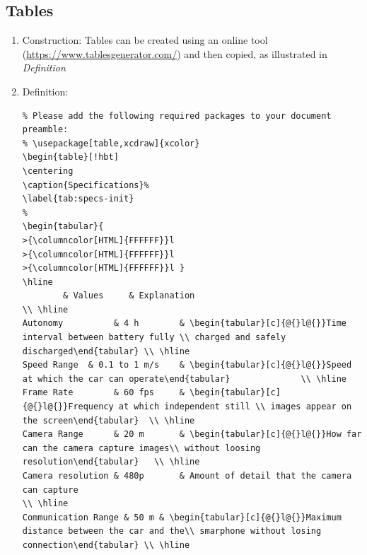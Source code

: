 \documentclass[11pt]{article}
\begin{document}
\subsection{Tables}
\label{sec:org333b62a}
\begin{enumerate}
\item Construction: Tables can be created using an online tool
(\url{https://www.tablesgenerator.com/}) and then copied, as illustrated in
\emph{Definition}
\item Definition: 
\lstset{language=[LaTeX]TeX,label= ,caption= ,captionpos=b,numbers=none}
\begin{lstlisting}
% Please add the following required packages to your document preamble:
% \usepackage[table,xcdraw]{xcolor}
\begin{table}[!hbt]
\centering
\caption{Specifications}%
\label{tab:specs-init}
%
\begin{tabular}{
>{\columncolor[HTML]{FFFFFF}}l 
>{\columncolor[HTML]{FFFFFF}}l 
>{\columncolor[HTML]{FFFFFF}}l }
\hline
		& Values     & Explanation                                                                                                  \\ \hline
Autonomy          & 4 h        & \begin{tabular}[c]{@{}l@{}}Time interval between battery fully \\ charged and safely discharged\end{tabular} \\ \hline
Speed Range  & 0.1 to 1 m/s    & \begin{tabular}[c]{@{}l@{}}Speed at which the car can operate\end{tabular}              \\ \hline
Frame Rate        & 60 fps     & \begin{tabular}[c]{@{}l@{}}Frequency at which independent still \\ images appear on the screen\end{tabular}  \\ \hline
Camera Range      & 20 m       & \begin{tabular}[c]{@{}l@{}}How far can the camera capture images\\ without loosing resolution\end{tabular}   \\ \hline
Camera resolution & 480p       & Amount of detail that the camera can capture                                                                 \\ \hline
Communication Range & 50 m & \begin{tabular}[c]{@{}l@{}}Maximum distance between the car and the\\ smarphone without losing connection\end{tabular} \\ \hline

\end{lstlisting}
\end{enumerate}
\end{document}
